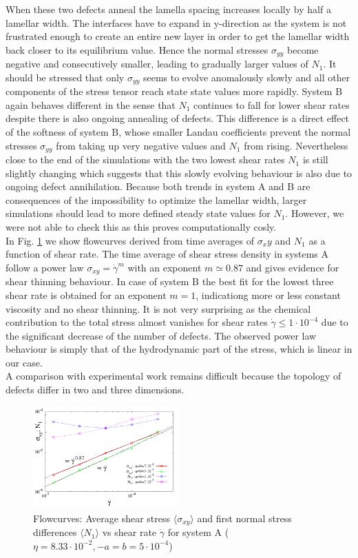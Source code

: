 \documentclass[8.5pt,twoside,twocolumn]{article}
\newcommand{\e}[1]{\cdot10^{#1}}
\begin{document}
When these two defects anneal the lamella spacing increases locally by half a lamellar width.
The interfaces have to expand in y-direction as the system is not frustrated enough to create an entire new layer in order to get the lamellar width back closer to its equilibrium value.
Hence the normal stresses $\sigma_{yy}$ become negative and consecutively smaller, leading to gradually larger values of $N_1$.
It should be stressed that only $\sigma_{yy}$ seems to evolve anomalously slowly and all other components of the stress tensor reach state state values more rapidly.
System B again behaves different in the sense that $N_1$ continues to fall for lower shear rates despite there is also ongoing annealing of defects.
This difference is a direct effect of the softness of system B, whose smaller Landau coefficients prevent the normal stresses $\sigma_{yy}$ from taking up very negative values and $N_1$ from rising.
Nevertheless close to the end of the simulations with the two lowest shear rates $N_1$ is still slightly changing which suggests that this slowly evolving behaviour is also due to ongoing defect annihilation.
Because both trends in system A and B are consequences of the impossibility to optimize the lamellar width, larger simulations should lead to more defined steady state values for $N_1$.
However, we were not able to check this as this proves computationally cosly.\\
In Fig. \ref{fig11} we show flowcurves derived from time averages of $\sigma_xy$ and $N_1$ as a function of shear rate.
The time average of shear stress density in systems A follow a power law $\sigma_{xy}=\dot{\gamma}^m$ with an exponent $m\simeq 0.87$ and gives evidence for shear thinning behaviour.
In case of system B the best fit for the lowest three shear rate is obtained for an exponent $m=1$, indicationg more or less constant viscosity and no shear thinning.
It is not very surprising as the chemical contribution to the total stress almost vanishes for shear rates $\dot{\gamma}\le1\e{-4}$ due to the significant decrease of the number of defects.
The observed power law behaviour is simply that of the hydrodynamic part of the stress, which is linear in our case.\\
A comparison with experimental work remains difficult because the topology of defects differ in two and three dimensions.
\begin{figure}[!]
\centering
\includegraphics[angle=0,width=0.5\textwidth]{S_xy_N1_gammadot.pdf}
\caption{Flowcurves: Average shear stress $\langle \sigma_{xy}\rangle$ and first normal stress differences $\langle N_1 \rangle$ vs shear rate $\dot{\gamma}$ for system A ($\eta=8.33\cdot10^{-2}, -a=b=5\cdot 10^{-4}$)} 
\label{fig11}
\end{figure}
\end{document}
